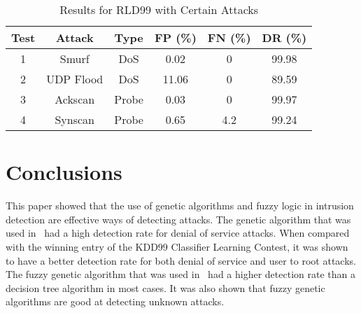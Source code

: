 \documentclass{sig-alternate}
\begin{document}
\begin{table}
\caption{Results for RLD99 with Certain Attacks}
\vspace{0.20cm}
\begin{tabular}{cccccc}
Test & Attack & Type & FP (\%) & FN (\%) & DR (\%)\\ \hline
1 & Smurf & DoS & 0.02 & 0 & 99.98\\
2 & UDP Flood & DoS & 11.06 & 0 & 89.59\\
3 & Ackscan & Probe & 0.03 & 0 & 99.97\\
4 & Synscan & Probe & 0.65 & 4.2 & 99.24\\
\end{tabular}
\label{tab:rldAttacks}
\end{table}




\section{Conclusions}
\label{sec:conclusion}
This paper showed that the use of genetic algorithms and fuzzy logic in intrusion detection are effective ways of detecting attacks. The genetic algorithm that was used in~\cite{DBLP:journals/corr/abs-1204-1336} had a high detection rate for denial of service attacks. When compared with the winning entry of the KDD99 Classifier Learning Contest, it was shown to have a better detection rate for both denial of service and user to root attacks. The fuzzy genetic algorithm that was used in~\cite{6496342, 6559603} had a higher detection rate than a decision tree algorithm in most cases. It was also shown that fuzzy genetic algorithms are good at detecting unknown attacks. 








  
\end{document}
